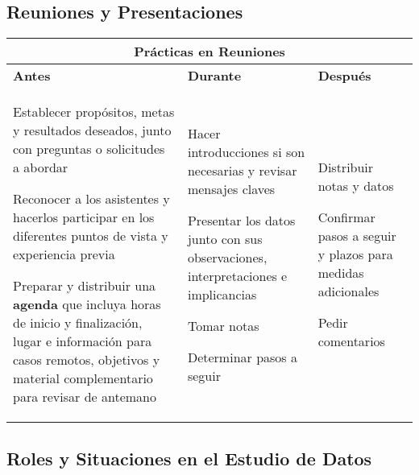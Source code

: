 \subsection{Reuniones y Presentaciones}
\begin{table}
    \centering
    \begin{tabular}{|p{4.8cm}|p{4.8cm}|p{4.8cm}}
        \hline
        \multicolumn{3}{|c|}{Prácticas en Reuniones} \\
        \hline
        \textbf{Antes} & \textbf{Durante}  &\textbf{Después} \\
        \hline
        \begin{description}
            \item {Establecer propósitos, metas y resultados deseados, junto con preguntas o solicitudes a abordar}
            \item {Reconocer a los asistentes y hacerlos participar en los diferentes puntos de vista y experiencia previa}
            \item {Preparar y distribuir una \textbf{agenda} que incluya horas de inicio y finalización, lugar e información para casos remotos, objetivos y material complementario para revisar de antemano}
        \end{description} & \begin{description}
            \item {Hacer introducciones si son necesarias y revisar mensajes claves}
            \item {Presentar los datos junto con sus observaciones, interpretaciones e implicancias}
            \item {Tomar notas}
            \item {Determinar pasos a seguir}
        \end{description} &  \begin{description}
            \item {Distribuir notas y datos}
            \item {Confirmar pasos a seguir y plazos para medidas adicionales}
            \item {Pedir comentarios}
        \end{description} \\
        \hline
    \end{tabular}
\end{table}



\subsection{Roles y Situaciones en el Estudio de Datos}
